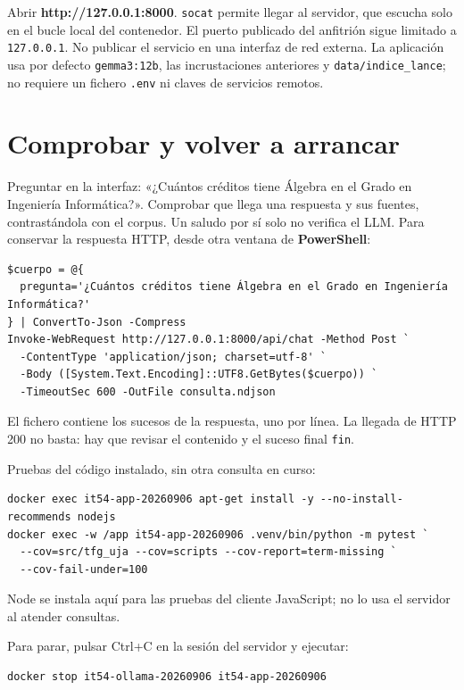 Abrir \textbf{http://127.0.0.1:8000}. \texttt{socat} permite llegar al servidor, que escucha
solo en el bucle local del contenedor. El puerto publicado del anfitrión sigue
limitado a \texttt{127.0.0.1}. No publicar el servicio en una interfaz de red externa.
La aplicación usa por defecto \texttt{gemma3:12b}, las incrustaciones anteriores y
\texttt{data/indice\_lance}; no requiere un fichero \texttt{.env} ni claves de servicios remotos.

\section{Comprobar y volver a arrancar}

Preguntar en la interfaz: «¿Cuántos créditos tiene Álgebra en el Grado en
Ingeniería Informática?». Comprobar que llega una respuesta y sus fuentes,
contrastándola con el corpus. Un saludo por sí solo no verifica el LLM.
Para conservar la respuesta HTTP, desde otra ventana de \textbf{PowerShell}:

\begingroup\footnotesize\begin{verbatim}
$cuerpo = @{
  pregunta='¿Cuántos créditos tiene Álgebra en el Grado en Ingeniería Informática?'
} | ConvertTo-Json -Compress
Invoke-WebRequest http://127.0.0.1:8000/api/chat -Method Post `
  -ContentType 'application/json; charset=utf-8' `
  -Body ([System.Text.Encoding]::UTF8.GetBytes($cuerpo)) `
  -TimeoutSec 600 -OutFile consulta.ndjson
\end{verbatim}\endgroup

El fichero contiene los sucesos de la respuesta, uno por línea. La llegada de
HTTP 200 no basta: hay que revisar el contenido y el suceso final \texttt{fin}.

Pruebas del código instalado, sin otra consulta en curso:

\begingroup\footnotesize\begin{verbatim}
docker exec it54-app-20260906 apt-get install -y --no-install-recommends nodejs
docker exec -w /app it54-app-20260906 .venv/bin/python -m pytest `
  --cov=src/tfg_uja --cov=scripts --cov-report=term-missing `
  --cov-fail-under=100
\end{verbatim}\endgroup

Node se instala aquí para las pruebas del cliente JavaScript; no lo usa el
servidor al atender consultas.

Para parar, pulsar Ctrl+C en la sesión del servidor y ejecutar:

\begingroup\footnotesize\begin{verbatim}
docker stop it54-ollama-20260906 it54-app-20260906
\end{verbatim}\endgroup

